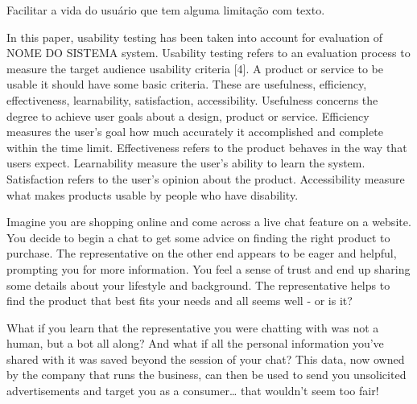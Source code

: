 \documentclass[
	12pt,				%
	oneside,   	        %
	a4paper,			%
	english,			%
	french,				%
	spanish,			%
	brazil,				%
	]{pacotes/abntex2}
\begin{document}
Facilitar a vida do usuário que tem alguma limitação com texto.

In this paper, usability testing has been taken into account for evaluation of NOME DO SISTEMA system. Usability testing
refers to an evaluation process to measure the target audience usability criteria [4]. A product or service to be usable
it should have some basic criteria. These are usefulness, efficiency, effectiveness, learnability, satisfaction,
accessibility. Usefulness concerns the degree to achieve user goals about a design, product or service. Efficiency
measures the user’s goal how much accurately it accomplished and complete within the time limit. Effectiveness
refers to the product behaves in the way that users expect. Learnability measure the user’s ability to learn the system.
Satisfaction refers to the user’s opinion about the product. Accessibility measure what makes products usable by
people who have disability.


Imagine you are shopping online and come across a live chat feature on a website. You decide to begin a chat to get some advice on finding the right product to purchase. The representative on the other end appears to be eager and helpful, prompting you for more information. You feel a sense of trust and end up sharing some details about your lifestyle and background. The representative helps to find the product that best fits your needs and all seems well - or is it?

What if you learn that the representative you were chatting with was not a human, but a bot all along? And what if all the personal information you’ve shared with it was saved beyond the session of your chat? This data, now owned by the company that runs the business, can then be used to send you unsolicited advertisements and target you as a consumer… that wouldn’t seem too fair!
\end{document}
